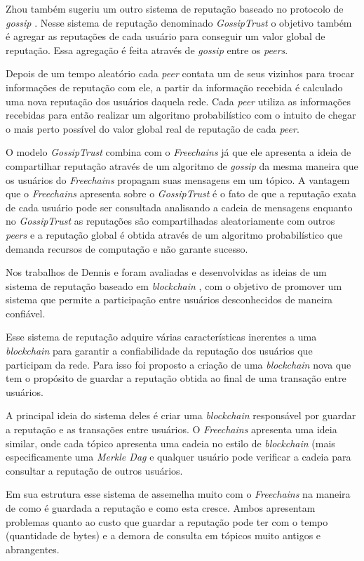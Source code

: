 \documentclass[12pt]{article}
\newcommand{\FC} {\emph{Freechains}\xspace}
\begin{document}
Zhou também sugeriu um outro sistema de reputação baseado no protocolo de \emph{gossip} \cite{zhou2007gossip}. Nesse sistema de reputação denominado \emph{GossipTrust} o objetivo também é agregar as reputações de cada usuário para conseguir um valor global de reputação. Essa agregação é feita através de \emph{gossip} entre os \emph{peers}.

Depois de um tempo aleatório cada \emph{peer} contata um de seus vizinhos para trocar informações de reputação com ele, a partir da informação recebida é calculado uma nova reputação dos usuários daquela rede. Cada \emph{peer} utiliza as informações recebidas para então realizar um algoritmo probabilístico com o intuito de chegar o mais perto possível do valor global real de reputação de cada \emph{peer}.

O modelo \emph{GossipTrust} combina com o \FC já que ele apresenta a ideia de compartilhar reputação através de um algoritmo de \emph{gossip} da mesma maneira que os usuários do \FC propagam suas mensagens em um tópico. A vantagem que o \FC apresenta sobre o \emph{GossipTrust} é o fato de que a reputação exata de cada usuário pode ser consultada analisando a cadeia de mensagens enquanto no \emph{GossipTrust} as reputações são compartilhadas aleatoriamente com outros \emph{peers} e a reputação global é obtida através de um algoritmo probabilístico que demanda recursos de computação e não garante sucesso. 

Nos trabalhos de Dennis e  foram avaliadas e desenvolvidas as ideias de um sistema de reputação baseado em \emph{blockchain} \cite{dennis2015rep} \cite{dennis2016rep}, com o objetivo de promover um sistema que permite a participação entre usuários desconhecidos de maneira confiável. 

Esse sistema de reputação adquire várias características inerentes a uma \emph{blockchain} para garantir a confiabilidade da reputação dos usuários que participam da rede. Para isso foi proposto a criação de uma \emph{blockchain} nova que tem o propósito de guardar a reputação obtida ao final de uma transação entre usuários.

A principal ideia do sistema deles é criar uma \emph{blockchain} responsável por guardar a reputação e as transações entre usuários. O \FC apresenta uma ideia similar, onde cada tópico apresenta uma cadeia no estilo de \emph{blockchain} (mais especificamente uma \emph{Merkle Dag} e qualquer usuário pode verificar a cadeia para consultar a reputação de outros usuários.

Em sua estrutura esse sistema de assemelha muito com o \FC na maneira de como é guardada a reputação e como esta cresce. Ambos apresentam problemas quanto ao custo que guardar a reputação pode ter com o tempo (quantidade de bytes) e a demora de consulta em tópicos muito antigos e abrangentes.
\end{document}
